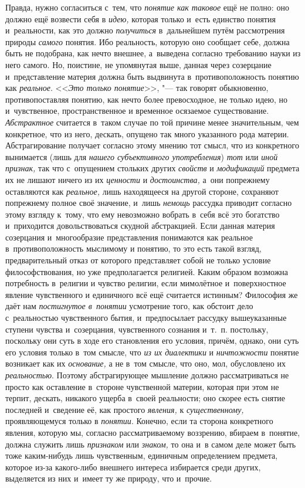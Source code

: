 Правда, нужно согласиться с~тем, что {\em понятие как таковое}
ещё не полно: оно должно ещё возвести себя в {\em идею,} которая
только и~есть единство понятия и~реальности, как это должно
{\em получиться} в~дальнейшем путём рассмотрения природы
{\em самого} понятия. Ибо
реальность, которую оно сообщает себе, должна быть не подобрана, как нечто
внешнее, а~выведена согласно требованию науки из него самого. Но, поистине,
не упомянутая выше, данная через созерцание и~представление материя должна
быть выдвинута в~противоположность понятию как {\em реальное}.
<<{\em Это только понятие}>>, "---
так говорят обыкновенно, противопоставляя понятию, как нечто
более превосходное, не только идею, но и~чувственное, пространственное и
временное осязаемое существование. {\em Абстрактное}
считается в~таком случае по той причине менее значительным,
чем конкретное, что из него, дескать, опущено так много указанного рода
материи. Абстрагирование получает согласно этому мнению тот смысл, что из
конкретного вынимается (лишь для {\em нашего субъективного
употребления}) {\em тот} или {\em иной признак,}
так что с~опущением стольких других {\em свойств} и {\em модификаций}
предмета их не лишают ничего из их {\em ценности} и {\em достоинства,} а~они
попрежнему оставляются как {\em реальное,} лишь находящееся на другой
стороне, сохраняют попрежнему полное своё значение, и~лишь {\em немощь}
рассудка приводит согласно этому взгляду к~тому, что ему
невозможно вобрать в~себя всё это богатство и~приходится довольствоваться
скудной абстракцией. Если данная материя созерцания и~многообразие
представления понимаются как реальное в~противоположность мыслимому и
понятию, то это есть такой взгляд, предварительный отказ от которого
представляет собой не только условие философствования, но уже
предполагается религией. Каким образом возможна потребность в~религии и
чувство религии, если мимолётное и~поверхностное явление чувственного и
единичного всё ещё считается истинным? Философия же даёт нам
{\em постигнутое в~понятии}
усмотрение того, как обстоит дело с~реальностью чувственного
бытия, и~предпосылает рассудку вышеуказанные ступени чувства и~созерцания,
чувственного сознания и~т.~п. постольку, поскольку они суть
в ходе его становления его условия, причём, однако, они суть его условия
только в~том смысле, что {\em из их диалектики} и
{\em ничтожности} понятие возникает как их {\em основание,}
а не в~том смысле, что оно, мол, обусловлено их {\em реальностью}.
Поэтому абстрагирующее мышление должно рассматриваться не
просто как оставление в~стороне чувственной материи, которая при этом не
терпит, дескать, никакого ущерба в~своей реальности; оно скорее есть снятие
последней и~сведение её, как простого {\em явления,} к {\em существенному,}
проявляющемуся только в {\em понятии}. Конечно,
если та сторона конкретного явления, которую мы, согласно рассматриваемому
воззрению, вбираем в~понятие, должна служить лишь
{\em признаком} или {\em знаком,} то она и~в
самом деле может быть тоже каким-нибудь лишь чувственным, единичным
определением предмета, которое из-за какого-либо внешнего интереса
избирается среди других, выделяется из них и~имеет ту же природу, что и~прочие.

